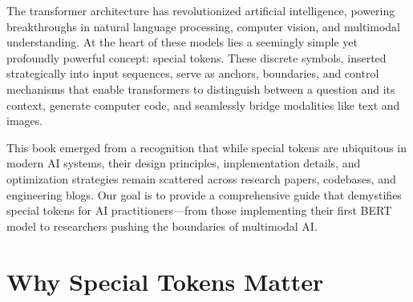 The transformer architecture has revolutionized artificial intelligence, powering breakthroughs in natural language processing, computer vision, and multimodal understanding. At the heart of these models lies a seemingly simple yet profoundly powerful concept: special tokens. These discrete symbols, inserted strategically into input sequences, serve as anchors, boundaries, and control mechanisms that enable transformers to distinguish between a question and its context, generate computer code, and seamlessly bridge modalities like text and images.
\begin{comment}
Feedback: This is a strong opening. To make it even better, consider adding a very specific, impressive example of what a special token enables. For instance, "...enable transformers to distinguish between a question and its context, or even to generate computer code." This could make the abstract concepts more concrete for the reader from the very beginning.

STATUS: addressed - added specific examples (question-context distinction, code generation, text-image bridging)
\end{comment}

This book emerged from a recognition that while special tokens are ubiquitous in modern AI systems, their design principles, implementation details, and optimization strategies remain scattered across research papers, codebases, and engineering blogs. Our goal is to provide a comprehensive guide that demystifies special tokens for AI practitioners---from those implementing their first BERT model to researchers pushing the boundaries of multimodal AI.

\section*{Why Special Tokens Matter}

